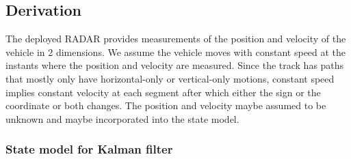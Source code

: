 \documentclass[11pt]{article}
\begin{document}

\subsection{Derivation}
\label{subsec:partB_derivation}

The deployed RADAR provides measurements of the position and velocity of the vehicle in 2 dimensions. We assume the vehicle moves with constant speed at the instants where the position and velocity are measured. Since the track has paths that mostly only have horizontal-only or vertical-only motions, constant speed implies constant velocity at each segment after which either the sign or the coordinate or both changes. The position and velocity maybe assumed to be unknown and maybe incorporated into the state model.


\subsubsection{State model for Kalman filter}
\label{subsubsec:stateModel}
\end{document}
